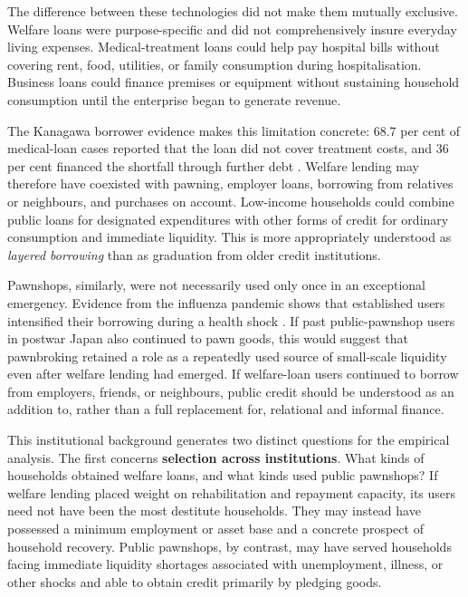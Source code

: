 \documentclass[12pt,a4paper]{article}
\begin{document}
The difference between these technologies did not make them mutually exclusive. Welfare loans were purpose-specific and did not comprehensively insure everyday living expenses. Medical-treatment loans could help pay hospital bills without covering rent, food, utilities, or family consumption during hospitalisation. Business loans could finance premises or equipment without sustaining household consumption until the enterprise began to generate revenue.

The Kanagawa borrower evidence makes this limitation concrete: 68.7 per cent of medical-loan cases reported that the loan did not cover treatment costs, and 36 per cent financed the shortfall through further debt \citep{Sakai2023}. Welfare lending may therefore have coexisted with pawning, employer loans, borrowing from relatives or neighbours, and purchases on account. Low-income households could combine public loans for designated expenditures with other forms of credit for ordinary consumption and immediate liquidity. This is more appropriately understood as \emph{layered borrowing} than as graduation from older credit institutions.

Pawnshops, similarly, were not necessarily used only once in an exceptional emergency. Evidence from the influenza pandemic shows that established users intensified their borrowing during a health shock \citep{Inoue2021}. If past public-pawnshop users in postwar Japan also continued to pawn goods, this would suggest that pawnbroking retained a role as a repeatedly used source of small-scale liquidity even after welfare lending had emerged. If welfare-loan users continued to borrow from employers, friends, or neighbours, public credit should be understood as an addition to, rather than a full replacement for, relational and informal finance.

This institutional background generates two distinct questions for the empirical analysis. The first concerns \textbf{selection across institutions}. What kinds of households obtained welfare loans, and what kinds used public pawnshops? If welfare lending placed weight on rehabilitation and repayment capacity, its users need not have been the most destitute households. They may instead have possessed a minimum employment or asset base and a concrete prospect of household recovery. Public pawnshops, by contrast, may have served households facing immediate liquidity shortages associated with unemployment, illness, or other shocks and able to obtain credit primarily by pledging goods.
\end{document}
